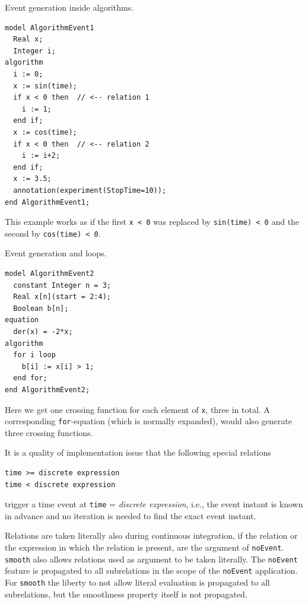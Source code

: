 \begin{example}
Event generation inside algorithms.
\begin{lstlisting}[language=modelica]
model AlgorithmEvent1
  Real x;
  Integer i;
algorithm
  i := 0;
  x := sin(time);
  if x < 0 then  // <-- relation 1
    i := 1;
  end if;
  x := cos(time);
  if x < 0 then  // <-- relation 2
    i := i+2;
  end if;
  x := 3.5;
  annotation(experiment(StopTime=10));
end AlgorithmEvent1;
\end{lstlisting}
This example works as if the first \lstinline!x < 0! was replaced by \lstinline!sin(time) < 0! and the second by \lstinline!cos(time) < 0!.
\end{example}

\begin{example}
Event generation and loops.
\begin{lstlisting}[language=modelica]
model AlgorithmEvent2
  constant Integer n = 3;
  Real x[n](start = 2:4);
  Boolean b[n];
equation
  der(x) = -2*x;
algorithm
  for i loop
    b[i] := x[i] > 1;
  end for;
end AlgorithmEvent2;
\end{lstlisting}
Here we get one crossing function for each element of \lstinline!x!, three in total.
A corresponding \lstinline!for!-equation (which is normally expanded), would also generate three crossing functions.
\end{example}

\begin{nonnormative}
It is a quality of implementation issue that the following special relations
\begin{lstlisting}[language=modelica]
time >= discrete expression
time < discrete expression
\end{lstlisting}
trigger a time event at \lstinline!time! = \emph{discrete expression}, i.e., the event instant is known in advance and no iteration is needed to find the exact event instant.
\end{nonnormative}

Relations are taken literally also during continuous integration, if the relation or the expression in which the relation is present, are the argument of \lstinline!noEvent!.
\lstinline!smooth! also allows relations used as argument to be taken literally.
The \lstinline!noEvent! feature is propagated to all subrelations in the scope of the \lstinline!noEvent! application.
For \lstinline!smooth! the liberty to not allow literal evaluation is propagated to all subrelations, but the smoothness property itself is not propagated.

